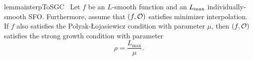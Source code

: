 \begin{restatable}{lemma}{interpToSGC}~\label{lemma:interpolation_to_sgc}
    Let \( f \) be an \( L \)-smooth function and \oracle{} an \( \Lmax \) individually-smooth \ac{SFO}.
    Furthermore, assume that \( \rbr{f, \oracle{}} \) satisfies minimizer interpolation.
    If \( f \) also satisfies the Polyak-Łojasiewicz condition with parameter \( \mu \), then \( \rbr{f, \oracle{}} \) satisfies the strong growth condition with parameter
    \[ \rho = \frac{L_{\text{max}}}{\mu}. \]
\end{restatable}

